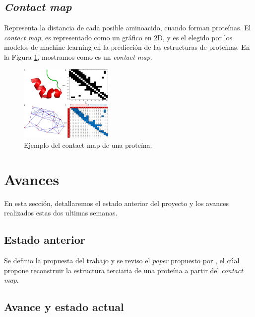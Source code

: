 \documentclass{article}
\begin{document}
	
	\subsection{\textit{Contact map}}
	
	Representa la distancia de cada posible aminoacido, cuando forman proteínas. El \textit{contact map}, es representado como un gráfico en 2D, y es el elegido por los modelos de machine learning en la predicción de las estructuras de proteínas. En la Figura \ref{fig:contact_map}, mostramos como es un \textit{contact map}.
	
	\begin{figure}
		\centering
		\includegraphics[width=0.4\textwidth]{img/papers/contact_map}
		\caption{Ejemplo del contact map de una proteína.}
		\label{fig:contact_map}
	\end{figure}
	
	\section{Avances}
	En esta sección, detallaremos el estado anterior del proyecto y los avances realizados estas dos ultimas semanas.
	
	\subsection{Estado anterior}
	
	Se definio la propuesta del trabajo y se reviso el \textit{paper} propuesto por  \cite{adhikari2018confold2}, el cúal propone reconstruir la estructura terciaria de una proteína a partir del \textit{contact map}. 
	
		
	\subsection{Avance y estado actual}
	
\end{document}
